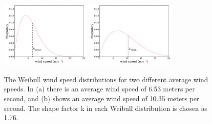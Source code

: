 \documentclass[wes, manuscript]{copernicus}
\begin{document}
\begin{figure}[htbp]
  \centering
  \includegraphics[width=0.4\textwidth]{Figures/weibull_6_53.pdf}\label{653}
  \includegraphics[width=0.4\textwidth]{Figures/weibull_10_35.pdf}\label{1035}
  \caption{\label{weibull} The Weibull wind speed distributions for two different average wind speeds. In (a) there is an average wind speed of 6.53 meters per second, and (b) shows an average wind speed of 10.35 meters per second. The shape factor k in each Weibull distribution is chosen as 1.76.}
\end{figure}
\end{document}
